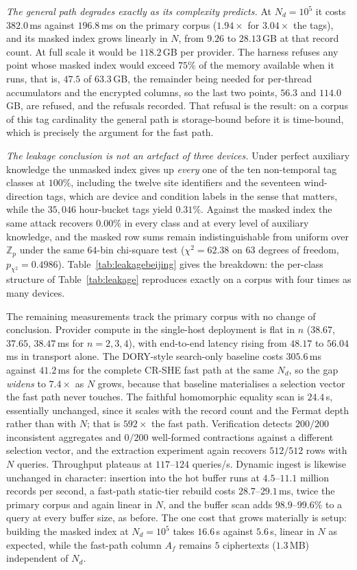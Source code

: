 \documentclass[a4paper,fleqn]{cas-dc}
\begin{document}
\emph{The general path degrades exactly as its complexity predicts.} At
$N_d=10^5$ it costs $382.0$\,ms against $196.8$\,ms on the primary corpus
($1.94\times$ for $3.04\times$ the tags), and its masked index grows linearly
in $N$, from $9.26$ to $28.13$\,GB at that record count. At full scale it
would be $118.2$\,GB per provider. The harness refuses any point whose masked
index would exceed $75\%$ of the memory available when it runs, that is,
$47.5$ of $63.3$\,GB, the remainder being needed for per-thread accumulators
and the encrypted columns, so the last two points, $56.3$ and $114.0$\,GB, are
refused, and the refusals recorded. That refusal is the result: on a
corpus of this tag cardinality the general path is storage-bound before it is
time-bound, which is precisely the argument for the fast path.

\emph{The leakage conclusion is not an artefact of three devices.} Under
perfect auxiliary knowledge the unmasked index gives up \emph{every} one of
the ten non-temporal tag classes at $100\%$, including the twelve site
identifiers and the seventeen wind-direction tags, which are device and
condition labels in the sense that matters, while the $35{,}046$ hour-bucket
tags yield $0.31\%$. Against the masked index the same attack recovers
$0.00\%$ in every class and at every level of auxiliary knowledge, and the
masked row sums remain indistinguishable from uniform over $\mathbb{Z}_p$
under the same $64$-bin chi-square test ($\chi^2=62.38$ on $63$ degrees of
freedom, $p_{\chi^2}=0.4986$). Table~\ref{tab:leakagebeijing} gives the
breakdown: the per-class structure of Table~\ref{tab:leakage} reproduces
exactly on a corpus with four times as many devices.

The remaining measurements track the primary corpus with no change of
conclusion. Provider compute in the single-host deployment is flat in $n$
($38.67$, $37.65$, $38.47$\,ms for $n=2,3,4$), with end-to-end latency rising
from $48.17$ to $56.04$\,ms in transport alone. The DORY-style search-only
baseline costs $305.6$\,ms against $41.2$\,ms for the complete CR-SHE fast
path at the same $N_d$, so the gap \emph{widens} to $7.4\times$ as $N$ grows,
because that baseline materialises a selection vector the fast path never
touches. The faithful homomorphic equality scan is $24.4$\,s, essentially
unchanged, since it scales with the record count and the Fermat depth rather
than with $N$; that is $592\times$ the fast path. Verification detects
$200/200$ inconsistent aggregates and $0/200$ well-formed contractions against
a different selection vector, and the extraction experiment again recovers
$512/512$ rows with $N$ queries. Throughput plateaus at $117$--$124$
queries/s. Dynamic ingest is likewise unchanged in character: insertion into
the hot buffer runs at $4.5$--$11.1$ million records per second, a fast-path
static-tier rebuild costs $28.7$--$29.1$\,ms, twice the primary corpus and
again linear in $N$, and the buffer scan adds $98.9$--$99.6\%$ to a query at
every buffer size, as before. The one cost that grows materially is setup:
building the masked index at $N_d=10^5$ takes $16.6$\,s against $5.6$\,s,
linear in $N$ as expected, while the fast-path column $A_f$ remains $5$
ciphertexts ($1.3$\,MB) independent of $N_d$.
\end{document}
